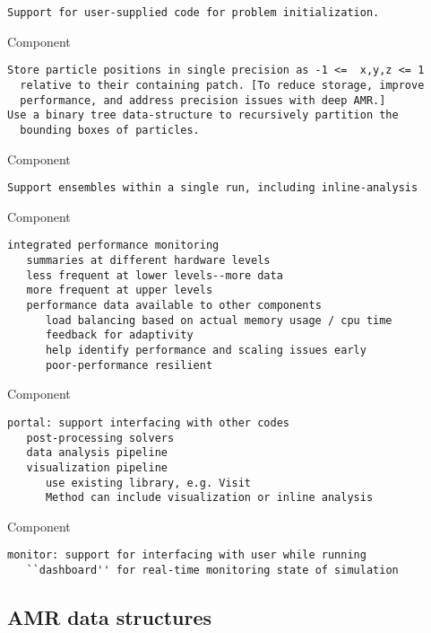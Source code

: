 \documentclass[14pt,letter]{article}
\begin{document}
\begin{verbatim}
Support for user-supplied code for problem initialization.
\end{verbatim}

 Component

\begin{verbatim}
Store particle positions in single precision as -1 <=  x,y,z <= 1
  relative to their containing patch. [To reduce storage, improve
  performance, and address precision issues with deep AMR.]
Use a binary tree data-structure to recursively partition the
  bounding boxes of particles.
\end{verbatim}

 Component

\begin{verbatim}
Support ensembles within a single run, including inline-analysis
\end{verbatim}

 Component

\begin{verbatim}
integrated performance monitoring
   summaries at different hardware levels
   less frequent at lower levels--more data
   more frequent at upper levels
   performance data available to other components
      load balancing based on actual memory usage / cpu time
      feedback for adaptivity
      help identify performance and scaling issues early
      poor-performance resilient
\end{verbatim}

 Component

\begin{verbatim}
portal: support interfacing with other codes
   post-processing solvers
   data analysis pipeline
   visualization pipeline
      use existing library, e.g. Visit
      Method can include visualization or inline analysis
\end{verbatim}

 Component

\begin{verbatim}
monitor: support for interfacing with user while running
   ``dashboard'' for real-time monitoring state of simulation
\end{verbatim}


\subsection{AMR data structures} \label{ss:datastructures}
\end{document}
